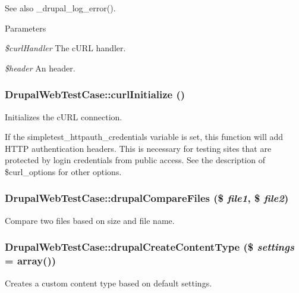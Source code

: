 \begin{DoxySeeAlso}{See also}
\_\-drupal\_\-log\_\-error().
\end{DoxySeeAlso}

\begin{DoxyParams}{Parameters}
\item[{\em \$curlHandler}]The cURL handler. \item[{\em \$header}]An header. \end{DoxyParams}
\hypertarget{class_drupal_web_test_case_a8c51d47f5b89aad9f5e7fc4fa001bf05}{
\subsubsection[{curlInitialize}]{\setlength{\rightskip}{0pt plus 5cm}DrupalWebTestCase::curlInitialize ()}}
\label{class_drupal_web_test_case_a8c51d47f5b89aad9f5e7fc4fa001bf05}
Initializes the cURL connection.

If the simpletest\_\-httpauth\_\-credentials variable is set, this function will add HTTP authentication headers. This is necessary for testing sites that are protected by login credentials from public access. See the description of \$curl\_\-options for other options. \hypertarget{class_drupal_web_test_case_a7bdda4e6c7063f5dbcfecb1c70a03432}{
\subsubsection[{drupalCompareFiles}]{\setlength{\rightskip}{0pt plus 5cm}DrupalWebTestCase::drupalCompareFiles (\$ {\em file1}, \/  \$ {\em file2})}}
\label{class_drupal_web_test_case_a7bdda4e6c7063f5dbcfecb1c70a03432}
Compare two files based on size and file name. \hypertarget{class_drupal_web_test_case_a880b99e54830cd0a56e2f37b65ec337f}{
\subsubsection[{drupalCreateContentType}]{\setlength{\rightskip}{0pt plus 5cm}DrupalWebTestCase::drupalCreateContentType (\$ {\em settings} = {\ttfamily array()})}}
\label{class_drupal_web_test_case_a880b99e54830cd0a56e2f37b65ec337f}
Creates a custom content type based on default settings.



